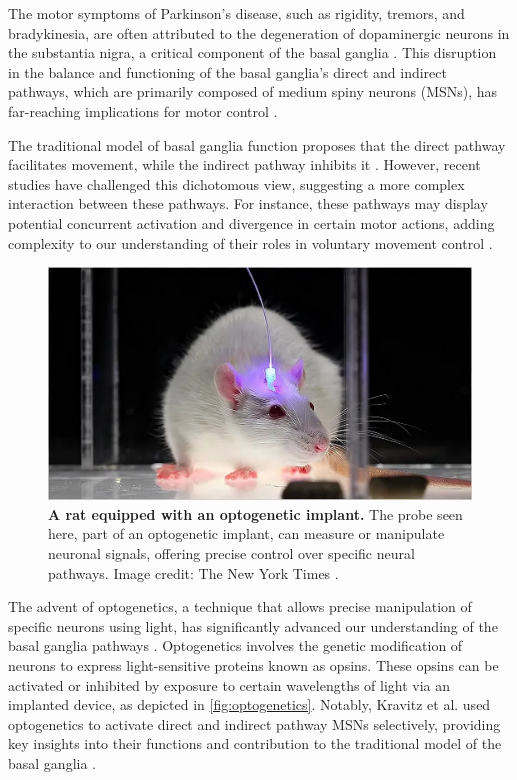 \documentclass[10pt]{article}
\begin{document}
\begin{sloppypar}
  The motor symptoms of Parkinson’s disease, such as rigidity, tremors, and bradykinesia, are often attributed to the degeneration of dopaminergic neurons in the substantia nigra, a critical component of the basal ganglia \citep{abedini_cooccurrence_2015}. This disruption in the balance and functioning of the basal ganglia’s direct and indirect pathways, which are primarily composed of medium spiny neurons (MSNs), has far-reaching implications for motor control \cite{abedini_cooccurrence_2015,ojagbemi_neuropsychiatric_2013}.

  The traditional model of basal ganglia function proposes that the direct pathway facilitates movement, while the indirect pathway inhibits it \citep{isett_indirect_2022}. However, recent studies have challenged this dichotomous view, suggesting a more complex interaction between these pathways. For instance, these pathways may display potential concurrent activation and divergence in certain motor actions, adding complexity to our understanding of their roles in voluntary movement control \citep{perez_striatal_2017}.

  \begin{figure}[ht]
    \centering
    \includegraphics[width=\textwidth]{figures/optogenetics.png}
    \caption[A rat equipped with an optogenetic implant]{\textbf{A rat equipped with an optogenetic implant.} The probe seen here, part of an optogenetic implant, can measure or manipulate neuronal signals, offering precise control over specific neural pathways. Image credit: The New York Times \citep{belluck_risky_2016}.}
    \label{fig:optogenetics}
  \end{figure}
  The advent of optogenetics, a technique that allows precise manipulation of specific neurons using light, has significantly advanced our understanding of the basal ganglia pathways \citep{deisseroth_next-generation_2006}. Optogenetics involves the genetic modification of neurons to express light-sensitive proteins known as opsins. These opsins can be activated or inhibited by exposure to certain wavelengths of light via an implanted device, as depicted in \autoref{fig:optogenetics}. Notably, Kravitz et al. used optogenetics to activate direct and indirect pathway MSNs selectively, providing key insights into their functions and contribution to the traditional model of the basal ganglia \citep{kravitz_regulation_2010}.


\end{sloppypar}
\end{document}
